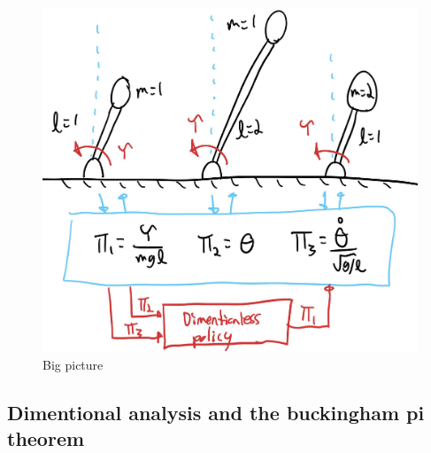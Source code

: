 \begin{figure}[t]
\begin{center}
\includegraphics[width=0.99\linewidth]{fig/big_picture.jpg}
\caption{Big picture}\label{fig:big_picture}
\end{center}
\end{figure}




\subsection{Dimentional analysis and the buckingham pi theorem}

